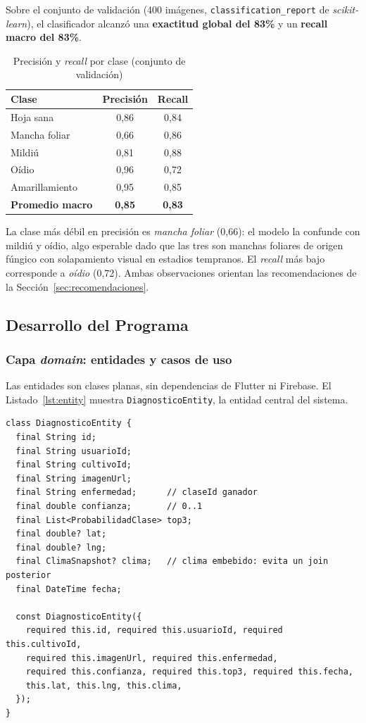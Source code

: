 \documentclass[12pt,a4paper]{article}
\begin{document}
Sobre el conjunto de validación (400 imágenes, \texttt{classification\_report}
de \textit{scikit-learn}), el clasificador alcanzó una \textbf{exactitud global
del 83\%} y un \textbf{recall macro del 83\%}.

\begin{table}[H]
\centering
\caption{Precisión y \textit{recall} por clase (conjunto de validación)}
\label{tab:metricas}
\renewcommand{\arraystretch}{1.25}
\begin{tabular}{l c c}
\toprule
\bfseries Clase & \bfseries Precisión & \bfseries Recall \\
\midrule
Hoja sana       & 0{,}86 & 0{,}84 \\
Mancha foliar   & 0{,}66 & 0{,}86 \\
Mildiú          & 0{,}81 & 0{,}88 \\
Oídio           & 0{,}96 & 0{,}72 \\
Amarillamiento  & 0{,}95 & 0{,}85 \\
\midrule
\bfseries Promedio macro & \bfseries 0{,}85 & \bfseries 0{,}83 \\
\bottomrule
\end{tabular}
\end{table}

La clase más débil en precisión es \textit{mancha foliar} (0{,}66): el modelo la
confunde con mildiú y oídio, algo esperable dado que las tres son manchas
foliares de origen fúngico con solapamiento visual en estadios tempranos. El
\textit{recall} más bajo corresponde a \textit{oídio} (0{,}72). Ambas
observaciones orientan las recomendaciones de la Sección~\ref{sec:recomendaciones}.

\subsection{Desarrollo del Programa}

\subsubsection{Capa \textit{domain}: entidades y casos de uso}

Las entidades son clases planas, sin dependencias de Flutter ni Firebase. El
Listado~\ref{lst:entity} muestra \texttt{DiagnosticoEntity}, la entidad central
del sistema.

\begin{lstlisting}[caption={Entidad de dominio del diagnóstico}, label={lst:entity}]
class DiagnosticoEntity {
  final String id;
  final String usuarioId;
  final String cultivoId;
  final String imagenUrl;
  final String enfermedad;      // claseId ganador
  final double confianza;       // 0..1
  final List<ProbabilidadClase> top3;
  final double? lat;
  final double? lng;
  final ClimaSnapshot? clima;   // clima embebido: evita un join posterior
  final DateTime fecha;

  const DiagnosticoEntity({
    required this.id, required this.usuarioId, required this.cultivoId,
    required this.imagenUrl, required this.enfermedad,
    required this.confianza, required this.top3, required this.fecha,
    this.lat, this.lng, this.clima,
  });
}
\end{lstlisting}
\end{document}
